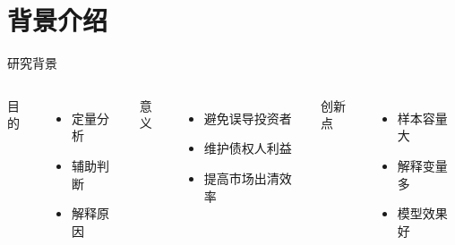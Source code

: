 \section{背景介绍}

\begin{frame}{研究背景}

    \begin{columns}[T,onlytextwidth]

            目的
            \begin{itemize}
                \item 定量分析
                \item 辅助判断
                \item 解释原因
            \end{itemize}

            意义
            \begin{itemize}
                \item 避免误导投资者
                \item 维护债权人利益
                \item 提高市场出清效率
            \end{itemize}
            创新点
            \begin{itemize}
                \item 样本容量大
                \item 解释变量多
                \item 模型效果好
            \end{itemize}

    \end{columns}

\end{frame}
